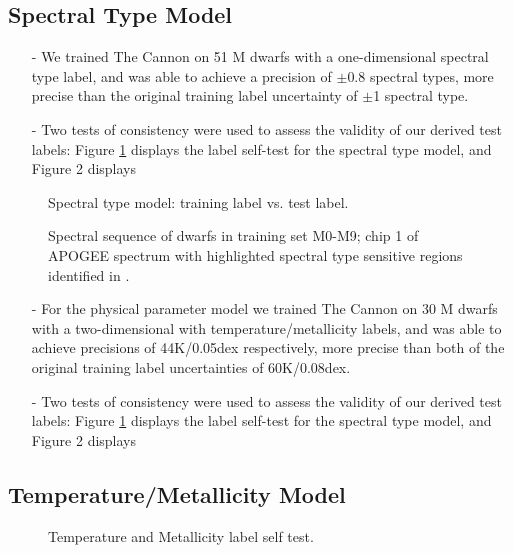\documentclass[modern]{aastex62}
\begin{document}
\subsection{Spectral Type Model}

\begin{enumerate}
\item[-] We trained The Cannon on 51 M dwarfs with a one-dimensional spectral type label, and was able to achieve a precision of $\pm$0.8 spectral types, more precise than the original training label uncertainty of $\pm$1 spectral type.
\item[-] Two tests of consistency were used to assess the validity of our derived test labels: Figure \ref{fig:west_selftest} displays the label self-test for the spectral type model, and Figure 2 displays 
\end{enumerate}


\begin{figure}[ht]
\caption{Spectral type model: training label vs. test label.} \label{fig:west_selftest}
\end{figure}


\begin{figure}[ht]
\caption{ Spectral sequence of dwarfs in training set M0-M9; chip 1 of APOGEE
spectrum with highlighted spectral type sensitive regions identified in \citealt{Desphande:2013}.} \label{fig:sp_sequence}
\end{figure}


\begin{enumerate}
\item[-] For the physical parameter model we trained The Cannon on 30 M dwarfs with a two-dimensional with temperature/metallicity labels, and was able to achieve precisions of 44K/0.05dex respectively, more precise than both of the original training label uncertainties of 60K/0.08dex.

\item[-] Two tests of consistency were used to assess the validity of our derived test labels: Figure \ref{fig:west_selftest} displays the label self-test for the spectral type model, and Figure 2 displays 
\end{enumerate}



\subsection{Temperature/Metallicity Model}
\begin{figure}[ht]
\caption{Temperature and Metallicity label self test.} \label{fig:mann_selftest}
\end{figure}
\end{document}
